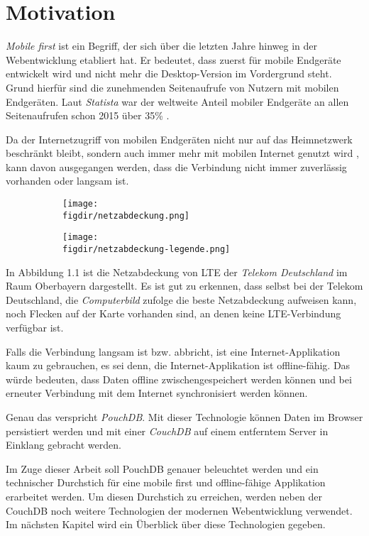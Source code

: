 \chapter{Motivation}
\label{Motivation}

\emph{Mobile first} ist ein Begriff, der sich über die letzten Jahre hinweg in der Webentwicklung etabliert hat. Er bedeutet, dass zuerst für mobile Endgeräte entwickelt wird und nicht mehr die Desktop-Version im Vordergrund steht. Grund hierfür sind die zunehmenden Seitenaufrufe von Nutzern mit mobilen Endgeräten. Laut \emph{Statista} war der weltweite Anteil mobiler Endgeräte an allen Seitenaufrufen schon 2015 über 35\% \cite{statista}.

Da der Internetzugriff von mobilen Endgeräten nicht nur auf das Heimnetzwerk beschränkt bleibt, sondern auch immer mehr mit mobilen Internet genutzt wird \cite{statista:datenverkehr}, kann davon ausgegangen werden, dass die Verbindung nicht immer zuverlässig vorhanden oder langsam ist.

\begin{figure}[htb]
\centering
\caption{LTE Abdeckung der Telekom Deutschland im Raum Oberbayern}
\label{fig:netzabdeckung}
\begin{subfigure}{0.79\textwidth}
\texttt{[image: \\figdir/netzabdeckung.png]}
\end{subfigure}
\begin{subfigure}{0.2\textwidth}
\texttt{[image: \\figdir/netzabdeckung-legende.png]}
\end{subfigure}
\end{figure}

In Abbildung 1.1 ist die Netzabdeckung von LTE der \emph{Telekom Deutschland} im Raum Oberbayern dargestellt. Es ist gut zu erkennen, dass selbst bei der Telekom Deutschland, die \emph{Computerbild} zufolge \cite{computerbild} die beste Netzabdeckung aufweisen kann, noch Flecken auf der Karte vorhanden sind, an denen keine LTE-Verbindung verfügbar ist.

Falls die Verbindung langsam ist bzw. abbricht, ist eine Internet-Applikation kaum zu gebrauchen, es sei denn, die Internet-Applikation ist offline-fähig. Das würde bedeuten, dass Daten offline zwischengespeichert werden können und bei erneuter Verbindung mit dem Internet synchronisiert werden können.

Genau das verspricht \emph{PouchDB}. Mit dieser Technologie können Daten im Browser persistiert werden und mit einer \emph{CouchDB} auf einem entferntem Server in Einklang gebracht werden.

Im Zuge dieser Arbeit soll PouchDB genauer beleuchtet werden und ein technischer Durchstich für eine mobile first und offline-fähige Applikation erarbeitet werden. Um diesen Durchstich zu erreichen, werden neben der CouchDB noch weitere Technologien der modernen Webentwicklung verwendet. Im nächsten Kapitel wird ein Überblick über diese Technologien gegeben.

